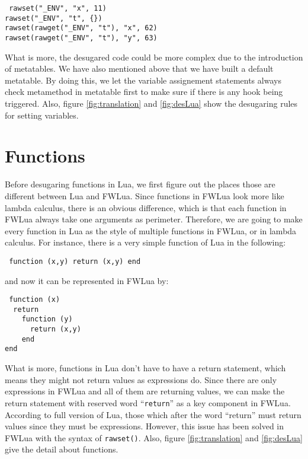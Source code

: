 \begin{flushleft}
{\tt
rawset("\_ENV", "x", 11)\\
rawset("\_ENV", "t", \{\})\\
rawset(rawget("\_ENV", "t"), "x", 62)\\
rawset(rawget("\_ENV", "t"), "y", 63)\\
}
\end{flushleft}

What is more, the desugared code could be more complex due to the introduction of metatables. We have also mentioned above that we have built a default metatable. By doing this, we let the variable assignement statements always check metamethod in metatable first to make sure if there is any hook being triggered. Also, figure \ref{fig:translation} and \ref{fig:desLua} show the desugaring rules for setting variables.

\section{Functions}
Before desugaring functions in Lua, we first figure out the places those are different between Lua and FWLua. Since functions in FWLua look more like lambda calculus, there is an obvious difference, which is that each function in FWLua always take one arguments as perimeter. Therefore, we are going to make every function in Lua as the style of multiple functions in FWLua, or in lambda calculus. For instance, there is a very simple function of Lua in the following:
\begin{flushleft}
{\tt
function (x,y) return (x,y) end
}
\end{flushleft}
and now it can be represented in FWLua by:
\begin{flushleft}
{\tt
function (x) \\
~~return \\
~~~~function (y) \\
~~~~~~return (x,y) \\
~~~~end \\
end \\
}
\end{flushleft}

What is more, functions in Lua don't have to have a return statement, which means they might not return values as expressions do. Since there are only expressions in FWLua and all of them are returning values, we can make the return statement with reserved word ``{\tt return}'' as a key component in FWLua. According to full version of Lua, those which after the word ``return'' must return values since they must be expressions. However, this issue has been solved in FWLua with the syntax of {\tt rawset()}. Also, figure \ref{fig:translation} and \ref{fig:desLua} give the detail about functions.

